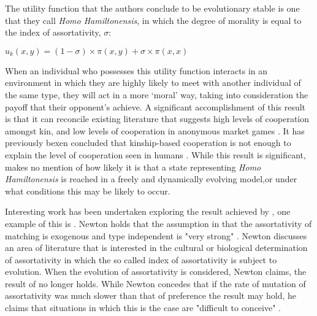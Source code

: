 \documentclass[11pt]{article}
\newcommand*{\np}{\par\noindent\newline}
\begin{document}
\np The  utility function that the authors conclude to be evolutionary stable is one that they call \textit{Homo
Hamiltonensis}, in which the degree of morality is equal to the index of assortativity, $\sigma$:
\begin{center}
	$u_k(x, y) = (1 - \sigma) \times \pi(x, y) + \sigma \times \pi(x, x)$
\end{center}
When an individual who possesses this utility function interacts in an environment in which they are highly likely
to meet with another individual of the same type, they will act in a more `moral' way, taking into consideration the
payoff that their opponent's achieve. A significant accomplishment of this result is that it can reconcile existing
literature that suggests high levels of cooperation amongst kin, and low levels of cooperation in anonymous market games \citep[See ][~p. 2296]{alger_homo_2013}. It has previously bexen concluded that kinship-based cooperation is not enough to explain the level of cooperation seen in humans \citep{van_veelen_why_2006}. While this result is significant, \citep{alger_homo_2013} makes no mention of how likely it is that a state representing \textit{Homo Hamiltonensis} is reached in a freely and dynamically evolving model,or under what conditions this may be likely to occur.

\np Interesting work has been undertaken exploring the result achieved by \citet{alger_homo_2013}, one example of this
is \citet{newton_preferences_2017}. Newton holds that the assumption in \citet{alger_homo_2013} that the assortativity
of matching is exogenous and type independent is "very strong" \citep{newton_preferences_2017}. Newton discusses an area
of literature that is interested in the cultural or biological determination of assortativity in which the
so called index of assortativity is subject to evolution. When the evolution of assortativity is considered, Newton
claims, the result of \citet{alger_homo_2013} no longer holds. While Newton concedes that if the rate of mutation of
assortativity was much slower than that of preference the result may hold, he claims that situations in which this is
the case are "difficult to conceive" \citep{newton_preferences_2017}.
\end{document}
